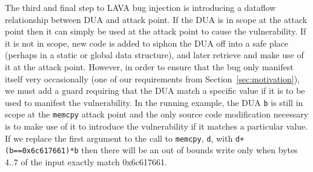 The third and final step to LAVA bug injection is introducing a dataflow relationship between DUA and attack point.  
If the DUA is in scope at the attack point then it can simply be used at the attack point to cause the vulnerability.
If it is not in scope, new code is added to siphon the DUA off into a safe place (perhaps in a static or global data structure), and later retrieve and make use of it at the attack point. 
However, in order to ensure that the bug only manifest itself very occasionally (one of our requirements from Section~\ref{sec:motivation}), we must add a guard requiring that the DUA match a specific value if it is to be used to manifest the vulnerability.
In the running example, the DUA \verb+b+ is still in scope at the \verb+memcpy+ attack point and the only source code modification necessary is to make use of it to introduce the vulnerability if it matches a particular value.  
If we replace the first argument to the call to \verb+memcpy+, \verb+d+, with \verb-d+(b==0x6c617661)*b- then there will be an out of bounds write only when bytes 4..7 of the input exactly match 0x6c617661. 
